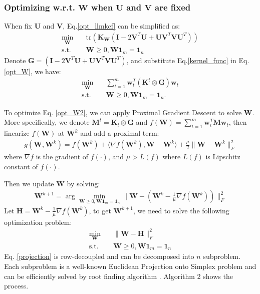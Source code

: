 \documentclass[10pt,journal,compsoc]{IEEEtran}
\newcommand{\st}{\mathrm{s.t.}}
\newcommand{\tr}{\mathrm{tr}}
\begin{document}
\subsubsection{Optimizing w.r.t. $\mathbf{W}$ when $\mathbf{U}$ and $\mathbf{V}$ are fixed}
When fix $\mathbf{U}$ and $\mathbf{V}$, Eq.\eqref{opt_llmkcf} can be simplified as:
\begin{align}\label{opt_W}
\min_{\mathbf{W}} \quad & \tr\left(\mathbf{K}_{\mathbf{W}}(\mathbf{I}-2\mathbf{V}^T\mathbf{U}+\mathbf{UV}^T\mathbf{VU}^T)\right)   \\
\st \quad  &\mathbf{W} \geq 0, \mathbf{W}\mathbf{1}_{m} = \mathbf{1}_{n}  \nonumber
\end{align}
Denote $\mathbf{G}=(\mathbf{I}-2\mathbf{V}^T\mathbf{U}+\mathbf{UV}^T\mathbf{VU}^T)$, and substitute Eq.\eqref{kernel_func} in Eq.\eqref{opt_W}, we have:
\begin{align}\label{opt_W2}
\min_{\mathbf{W}} \quad & \sum_{t=1}^{m} \mathbf{w}_t^T (\mathbf{K}^t \otimes \mathbf{G}) \mathbf{w}_t\\
\st \quad & \mathbf{W} \geq 0, \mathbf{W} \mathbf{1}_{m} = \mathbf{1}_{n}. \nonumber
\end{align}

To optimize Eq. \eqref{opt_W2}, we can apply Proximal Gradient Descent \cite{PG} to solve $\mathbf{W}$. More specifically, we denote $\mathbf{M}^t=\mathbf{K}_t \otimes \mathbf{G}$ and $f(\mathbf{W})=\sum_{t=1}^{m} \mathbf{w}_t^T \mathbf{M} \mathbf{w}_t$, then linearize $f(\mathbf{W})$ at $\mathbf{W}^k$ and add a proximal term:
\begin{align}
g(\mathbf{W},\mathbf{W}^k) =  f(\mathbf{W}^k)+ \langle\nabla f(\mathbf{W}^k),\mathbf{W}-\mathbf{W}^k\rangle+\frac{\mu}{2}\|\mathbf{W}-\mathbf{W}^k\|_F^2
\end{align}
where $\nabla f$ is the gradient of $f(\cdot)$, and $\mu>L(f)$ where $L(f)$ is Lipschitz constant of $f(\cdot)$.

Then we update $\mathbf{W}$ by solving:
\begin{align}\label{update_W2}
\mathbf{W}^{k+1}=\arg\min_{\mathbf{W}\geq0,\mathbf{W} \mathbf{1}_{m} = \mathbf{1}_{n}}\|\mathbf{W}-\left(\mathbf{W}^k-\frac{1}{\mu}\nabla f(\mathbf{W}^k)\right)\|_F^2
\end{align}
Let $\mathbf{H}=\mathbf{W}^k-\frac{1}{\mu}\nabla f(\mathbf{W}^k)$, to get $\mathbf{W}^{k+1}$, we need to solve the following optimization problem:
\begin{align}\label{projection}
\min_{\mathbf{W}}\quad & \|\mathbf{W}-\mathbf{H}\|_F^2 \\
\st \quad & \mathbf{W}\geq0,\mathbf{W} \mathbf{1}_{m} = \mathbf{1}_{n} \nonumber
\end{align}
Eq. \eqref{projection} is row-decoupled and can be decomposed into $n$ subproblem. Each subproblem is a well-known Euclidean Projection onto Simplex problem and can be efficiently solved by root finding algorithm \cite{simplexprojection}. Algorithm 2 shows the process.
\end{document}
